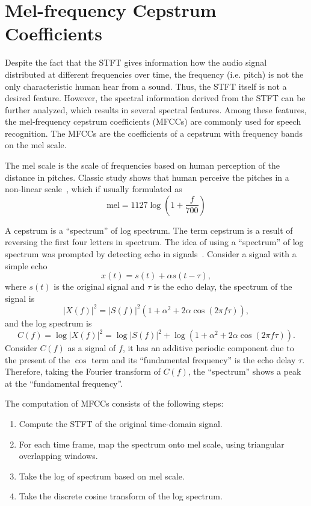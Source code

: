 \documentclass[12pt,final,twoside]{report}
\theoremstyle{plain}
\theoremstyle{definition}
\theoremstyle{remark}
\begin{document}
\section{Mel-frequency Cepstrum Coefficients}
Despite the fact that the STFT gives information how the audio signal distributed at different frequencies over time, the frequency (i.e. pitch) is not the only characteristic human hear from a sound. Thus, the STFT itself is not a desired feature. However, the spectral information derived from the STFT can be further analyzed, which results in several spectral features. Among these features, the mel-frequency cepstrum coefficients (MFCCs) are commonly used for speech recognition.
The MFCCs are the coefficients of a cepstrum with frequency bands on the mel scale.

The mel scale is the scale of frequencies based on human perception of the distance in pitches. Classic study shows that human perceive the pitches in a non-linear scale~\cite{stevens_scale_1937}, which if usually formulated as~\cite{oshaughnessy_speech_1987}
\begin{equation}
  \text{mel} = 1127 \log (1 + \frac{f}{700})
\end{equation}

A cepstrum is a ``spectrum'' of log spectrum. The term cepstrum is a result of reversing the first four letters in spectrum. The idea of using a ``spectrum'' of log spectrum was prompted by detecting echo in signals~\cite{oppenheim_frequency_2004}. Consider a signal with a simple echo
\begin{equation}
  x(t) = s(t) + \alpha s(t - \tau),
\end{equation}
where $s(t)$ is the original signal and $\tau$ is the echo delay, the spectrum of the signal is
\begin{equation}
  \left| X(f) \right|^2 = \left| S(f) \right|^2 (1 + \alpha^2 + 2 \alpha \cos(2 \pi f \tau)),
\end{equation}
and the log spectrum is
\begin{equation}
  C(f) = \log \left| X(f) \right|^2 = \log \left| S(f) \right|^2 + \log (1 + \alpha^2 + 2 \alpha \cos(2 \pi f \tau)).
\end{equation}
Consider $C(f)$ as a signal of $f$, it has an additive periodic component due to the present of the $\cos$ term and its ``fundamental frequency'' is the echo delay $\tau$. Therefore, taking the Fourier transform of $C(f)$, the ``spectrum'' shows a peak at the ``fundamental frequency''. 

The computation of MFCCs consists of the following steps:
\begin{enumerate}
  \item Compute the STFT of the original time-domain signal.
  \item For each time frame, map the spectrum onto mel scale, using triangular overlapping windows.
  \item Take the log of spectrum based on mel scale.
  \item Take the discrete cosine transform of the log spectrum.
\end{enumerate}
\end{document}
